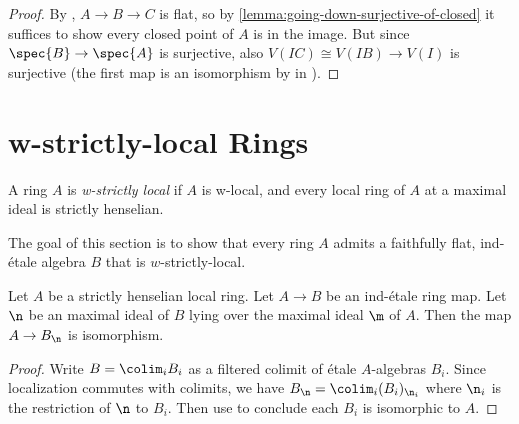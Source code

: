 \begin{proof}
  \leanok
  By , $A \to B \to C$ is flat, so by \ref{lemma:going-down-surjective-of-closed} it suffices
  to show every closed point of $A$ is in the image. But since $\spec{B} \to \spec{A}$ is surjective,
  also $V(IC) \cong V(IB) \to V(I)$ is surjective (the first map is an isomorphism by  in ).
\end{proof}


\section{w-strictly-local Rings}

\begin{definition}
    A ring \(A\) is \emph{w-strictly local} if \(A\) is w-local, and every local ring of \(A\) at a
    maximal ideal is strictly henselian.
    \label{def:w-strictly-local-ring}
    \leanok
\end{definition}

The goal of this section is to show that every ring $A$ admits a faithfully flat, ind-étale algebra $B$ that is $w$-strictly-local.

\begin{lemma}
  \label{thm:ind-etale-strictly-henselian-localization-isom}
  Let \(A\) be a strictly henselian local ring. Let \(A \to B\) be an ind-étale ring map.
  Let $\n$ be an maximal ideal of $B$ lying over the maximal ideal $\m$ of $A$.
  Then the map $A \to B_\n$ is isomorphism.
\end{lemma}

\begin{proof}
  Write $B = \colim_i B_i$ as a filtered colimit of étale $A$-algebras $B_i$. Since localization commutes with colimits, we have $B_\n = \colim_i (B_i)_{\n_i}$ where $\n_i$ is the restriction of $\n$ to $B_i$. Then use  to conclude each $B_i$ is isomorphic to $A$.
\end{proof}

